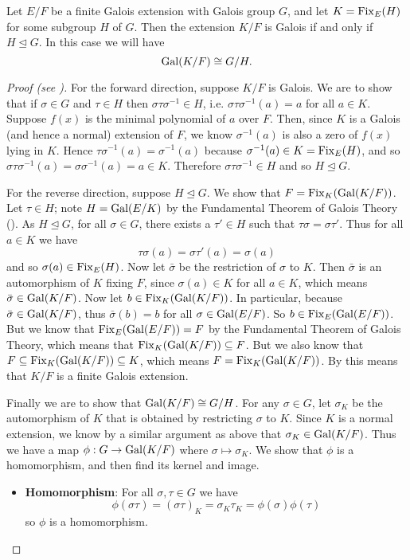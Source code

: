 \begin{theorem}\label{thrm-intermediate-field-that-is-galois-extension-of-base-field-iff-subgroup-is-normal}
    Let $E/F$ be a finite Galois extension with Galois group $G$, and let $K = \mathrm{Fix}_{E}(H)$ for some subgroup $H$ of $G$. Then the extension $K/F$ is Galois if and only if $H \unlhd G$. In this case we will have
    \[
        \mathrm{Gal}(K/F) \cong G/H.
    \]
\end{theorem}
\begin{proof}[Proof (see {\cite[Theorem 23.23, Statment 4]{judson_beezer_2022}})]
    For the forward direction, suppose $K/F$ is Galois. We are to show that if $\sigma \in G$ and $\tau \in H$ then $\sigma\tau\sigma^{-1} \in H$, i.e. $\sigma\tau\sigma^{-1}(a) = a$ for all $a \in K$. Suppose $f(x)$ is the minimal polynomial of $a$ over $F$. Then, since $K$ is a Galois (and hence a normal) extension of $F$, we know $\sigma^{-1}(a)$ is also a zero of $f(x)$ lying in $K$. Hence $\tau\sigma^{-1}(a) = \sigma^{-1}(a)$ because $\sigma^{-1}(a) \in K = \mathrm{Fix}_{E}(H)$, and so $\sigma\tau\sigma^{-1}(a) = \sigma\sigma^{-1}(a) = a \in K$. Therefore $\sigma\tau\sigma^{-1} \in H$ and so $H \unlhd G$.

    For the reverse direction, suppose $H \unlhd G$. We show that $F = \mathrm{Fix}_{K}(\mathrm{Gal}(K/F))$. Let $\tau \in H$; note $H = \mathrm{Gal}(E/K)$ by the Fundamental Theorem of Galois Theory (). As $H \unlhd G$, for all $\sigma \in G$, there exists a $\tau' \in H$ such that $\tau\sigma = \sigma\tau'$. Thus for all $a \in K$ we have
    \[
        \tau\sigma(a) = \sigma\tau'(a) = \sigma(a)
    \]
    and so $\sigma(a) \in \mathrm{Fix}_{E}(H)$. Now let $\bar{\sigma}$ be the restriction of $\sigma$ to $K$. Then $\bar{\sigma}$ is an automorphism of $K$ fixing $F$, since $\sigma(a) \in K$ for all $a \in K$, which means $\bar{\sigma} \in \mathrm{Gal}(K/F)$. Now let $b \in \mathrm{Fix}_{K}(\mathrm{Gal}(K/F))$. In particular, because $\bar{\sigma} \in \mathrm{Gal}(K/F)$, thus $\bar{\sigma}(b) = b$ for all $\sigma \in \mathrm{Gal}(E/F)$. So $b \in \mathrm{Fix}_{E}(\mathrm{Gal}(E/F))$. But we know that $\mathrm{Fix}_{E}(\mathrm{Gal}(E/F)) = F$ by the Fundamental Theorem of Galois Theory, which means that $\mathrm{Fix}_{K}(\mathrm{Gal}(K/F)) \subseteq F$. But we also know that $F \subseteq \mathrm{Fix}_{K}(\mathrm{Gal}(K/F)) \subseteq K$, which means $F = \mathrm{Fix}_{K}(\mathrm{Gal}(K/F))$. By  this means that $K/F$ is a finite Galois extension.

    Finally we are to show that $\mathrm{Gal}(K/F) \cong G/H$. For any $\sigma \in G$, let $\sigma_K$ be the automorphism of $K$ that is obtained by restricting $\sigma$ to $K$. Since $K$ is a normal extension, we know by a similar argument as above that $\sigma_K \in \mathrm{Gal}(K/F)$. Thus we have a map $\phi: G \to \mathrm{Gal}(K/F)$ where $\sigma \mapsto \sigma_K$. We show that $\phi$ is a homomorphism, and then find its kernel and image.
    \begin{itemize}
        \item \textbf{Homomorphism}: For all $\sigma, \tau \in G$ we have
        \[
            \phi(\sigma\tau) = (\sigma\tau)_K = \sigma_K\tau_K = \phi(\sigma)\phi(\tau)
        \]
        so $\phi$ is a homomorphism.


\end{itemize}
\end{proof}
